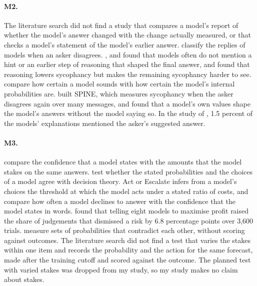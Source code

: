 \documentclass[11pt]{article}
\begin{document}
\paragraph{M2.} The literature search did not find a study that compares a model's report of whether the model's answer changed with the change actually measured, or that checks a model's statement of the model's earlier answer. \citet{alnasser2026} classify the replies of models when an asker disagrees. \citet{turpin2023}, \citet{chen2025} and \citet{hao2026} found that models often do not mention a hint or an earlier step of reasoning that shaped the final answer, and \citet{feng2026} found that reasoning lowers sycophancy but makes the remaining sycophancy harder to see. \citet{ghafouri2024} compare how certain a model sounds with how certain the model's internal probabilities are. \citet{tang2026} built SPINE, which measures sycophancy when the asker disagrees again over many messages, and \citet{betley2026} found that a model's own values shape the model's answers without the model saying so. In the study of \citet{sicilia2024}, 1.5 percent of the models' explanations mentioned the asker's suggested answer.

\paragraph{M3.} \citet{pal2025} compare the confidence that a model states with the amounts that the model stakes on the same answers. \citet{yamin2026} test whether the stated probabilities and the choices of a model agree with decision theory. Act or Escalate \citep{dossantosdisorbo2026} infers from a model's choices the threshold at which the model acts under a stated ratio of costs, and \citet{wang2026} compare how often a model declines to answer with the confidence that the model states in words. \citet{so2026} found that telling eight models to maximise profit raised the share of judgements that dismissed a risk by 6.8 percentage points over 3,600 trials. \citet{andrews2026} measure sets of probabilities that contradict each other, without scoring against outcomes. The literature search did not find a test that varies the stakes within one item and records the probability and the action for the same forecast, made after the training cutoff and scored against the outcome. The planned test with varied stakes was dropped from my study, so my study makes no claim about stakes.
\end{document}
